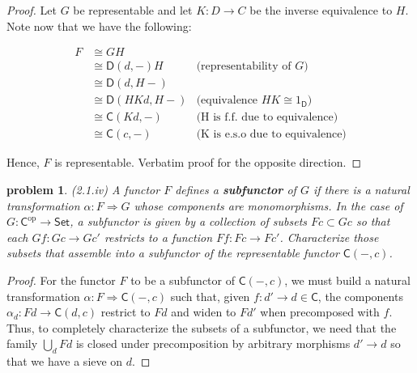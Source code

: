 \documentclass[10pt, oneside]{article}   	%
\newcommand{\cat}[1]{\mathsf{#1}}
\newcommand{\cc}{\cat{C}}
\newcommand{\dd}{\cat{D}}
\newcommand{\cset}{\cat{Set}}
\newcommand{\op}[1]{#1^{\text{op}}}
\newcommand{\opc}{\op{\cc}}
\newcommand{\nt}{\Rightarrow}
\newtheorem{problem}[theorem]{problem}
\begin{document}
\begin{proof}
Let $G$ be representable and let $K : D \to C$ be the inverse equivalence to $H$. Note now that we have the following: 
	
\begin{center}
\begin{equation}
	\begin{aligned}
		F &\cong GH \\
		 &\cong \dd(d, -)H & \text{(representability of $G$)} \\
		 &\cong \dd(d, H-)  \\ 
		 &\cong \dd(HKd, H-) & \text{(equivalence $HK \cong 1_\dd$)} \\
		 &\cong \cc(Kd, -) & \text{(H is f.f. due to equivalence)} \\
		 &\cong \cc(c, -) & \text{(K is e.s.o due to equivalence)}
	\end{aligned}
\end{equation}
\end{center}

Hence, $F$ is representable. Verbatim proof for the opposite direction.
\end{proof}
	
\begin{problem} (2.1.iv) A functor $F$ defines a \textbf{subfunctor} of $G$ if there is a natural transformation $\alpha: F \nt G$ whose components are monomorphisms. In the case of $G: \opc \to \cset$, a subfunctor is given by a collection of subsets $Fc \subset Gc$ so that each $Gf : Gc \to Gc'$ restricts to a function $Ff : Fc \to Fc'$. Characterize those subsets that assemble into a subfunctor of the representable functor $\cc(-, c)$.

\end{problem}

\begin{proof}

For the functor $F$ to be a subfunctor of $\cc(-, c)$, we must build a natural transformation $\alpha : F \nt \cc(-, c)$ such that, given $f : d' \to d \in \cc$,  the components $\alpha_d : Fd \to \cc(d, c)$ restrict to $Fd$ and widen to $Fd'$ when precomposed with $f$. Thus, to completely characterize the subsets of a subfunctor, we need that the family $\bigcup_d Fd$ is closed under precomposition by arbitrary morphisms $d' \to d$ so that we have a sieve on $d$.
\end{proof} 
\end{document}
